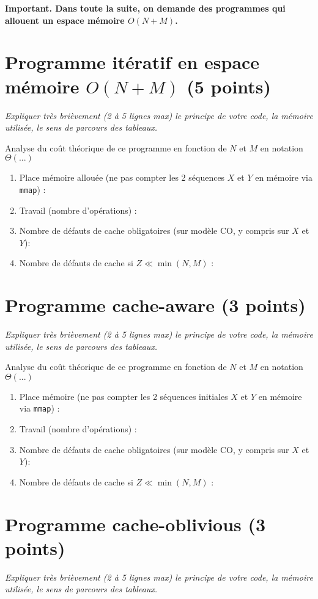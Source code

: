 \documentclass[10pt,a4paper]{article}
\begin{document}
{\noindent\bf{Important.} Dans toute la suite, on demande des programmes qui allouent un espace mémoire $O(N+M)$.

\section{Programme itératif en espace mémoire $O(N+M)$ (5 points)}
{\em Expliquer très brièvement (2 à 5 lignes max) le principe de votre code, la mémoire utilisée, le sens de parcours des tableaux.}
\vspace*{1.0cm}

Analyse du coût théorique de ce programme en fonction de $N$ et $M$ en notation $\Theta(...)$
\begin{enumerate}
  \item Place mémoire allouée (ne pas compter les 2 séquences $X$ et $Y$ en mémoire via {\tt mmap}) :
  \item Travail (nombre d'opérations) :
  \item Nombre de défauts de cache obligatoires (sur modèle CO, y compris sur $X$ et $Y$):
  \item Nombre de défauts de cache si $Z \ll \min(N,M)$ :
\end{enumerate}

\section{Programme cache-aware (3 points)}
{\em Expliquer très brièvement (2 à 5 lignes max) le principe de votre code, la mémoire utilisée, le sens de parcours des tableaux.}
\vspace*{1.0cm}

Analyse du coût théorique de ce programme en fonction de $N$ et $M$ en notation $\Theta(...)$
\begin{enumerate}
  \item Place mémoire (ne pas compter les 2 séquences initiales $X$ et $Y$ en mémoire via {\tt mmap}) :
  \item Travail (nombre d'opérations) :
  \item Nombre de défauts de cache obligatoires (sur modèle CO, y compris sur $X$ et $Y$):
  \item Nombre de défauts de cache si $Z \ll \min(N,M)$ :
\end{enumerate}

\section{Programme cache-oblivious (3 points)}
{\em Expliquer très brièvement (2 à 5 lignes max) le principe de votre code, la mémoire utilisée, le sens de parcours des tableaux.}
\vspace*{1.0cm}

}
\end{document}
